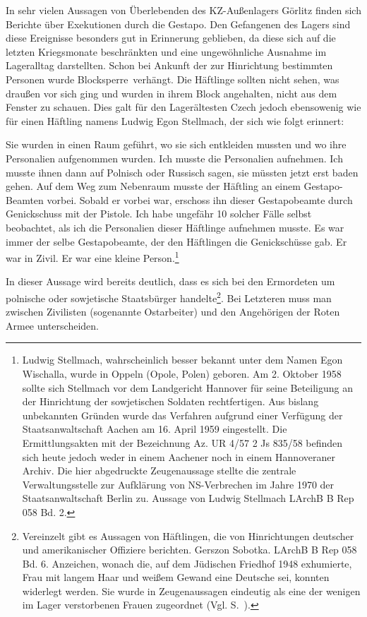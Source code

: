 \documentclass[a4paper,12pt,ngerman,
]{nisebook}
\begin{document}
In sehr vielen Aussagen von Überlebenden des KZ-Außenlagers Görlitz finden sich Berichte über Exekutionen durch die Gestapo. Den Gefangenen des Lagers sind diese Ereignisse besonders gut in Erinnerung geblieben, da diese sich auf die letzten Kriegsmonate beschränkten und eine ungewöhnliche Ausnahme im Lageralltag darstellten. Schon bei Ankunft der zur Hinrichtung bestimmten Personen wurde \glqq Blocksperre\grqq~verhängt. Die Häftlinge sollten nicht sehen, was draußen vor sich ging und wurden in ihrem Block angehalten, nicht aus dem Fenster zu schauen. Dies galt für den Lagerältesten Czech jedoch ebensowenig wie für einen Häftling namens Ludwig Egon Stellmach, der sich wie folgt erinnert:
\begin{leftbar}
Sie wurden in einen Raum geführt, wo sie sich entkleiden mussten und wo ihre Personalien aufgenommen wurden. Ich musste die Personalien aufnehmen. Ich musste ihnen dann auf Polnisch oder Russisch sagen, sie müssten jetzt erst baden gehen. Auf dem Weg zum Nebenraum musste der Häftling an einem Gestapo-Beamten vorbei. Sobald er vorbei war, erschoss ihn dieser Gestapobeamte durch Genickschuss mit der Pistole. Ich habe ungefähr 10 solcher Fälle selbst beobachtet, als ich die Personalien dieser Häftlinge aufnehmen musste. Es war immer der selbe Gestapobeamte, der den Häftlingen die Genickschüsse gab. Er war in Zivil. Er war eine kleine Person.\footnote{Ludwig Stellmach, wahrscheinlich besser bekannt unter dem Namen Egon Wischalla, wurde in Oppeln (Opole, Polen) geboren. Am 2. Oktober 1958 sollte sich Stellmach vor dem Landgericht Hannover für seine Beteiligung an der Hinrichtung der sowjetischen Soldaten rechtfertigen. Aus bislang unbekannten Gründen wurde das Verfahren aufgrund einer Verfügung der Staatsanwaltschaft Aachen am 16. April 1959 eingestellt. Die Ermittlungsakten mit der Bezeichnung Az. UR 4/57 2 Js 835/58 befinden sich heute jedoch weder in einem Aachener noch in einem Hannoveraner Archiv. Die hier abgedruckte Zeugenaussage stellte die zentrale Verwaltungsstelle zur Aufklärung von NS-Verbrechen im Jahre 1970 der Staatsanwaltschaft Berlin zu. Aussage von Ludwig Stellmach LArchB B Rep 058 Bd. 2.}
\end{leftbar}
\newpage
In dieser Aussage wird bereits deutlich, dass es sich bei den Ermordeten um polnische oder sowjetische Staatsbürger handelte\footnote{Vereinzelt gibt es Aussagen von Häftlingen, die von Hinrichtungen deutscher und amerikanischer Offiziere berichten. Gerszon Sobotka. LArchB B Rep 058 Bd. 6. Anzeichen, wonach die, auf dem Jüdischen Friedhof 1948 exhumierte, Frau mit langem Haar und weißem Gewand eine Deutsche sei, konnten widerlegt werden. Sie wurde in Zeugenaussagen eindeutig als eine der wenigen im Lager verstorbenen Frauen zugeordnet (Vgl. S.~\pageref{weiss}).}. Bei Letzteren muss man zwischen Zivilisten (sogenannte Ostarbeiter) und den Angehörigen der Roten Armee unterscheiden.
\end{document}
